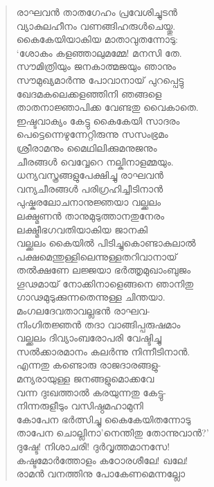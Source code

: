 \begin{verse}
രാഘവന്‍ താതഗേഹം പ്രവേശിച്ചുടന്‍\\
വ്യാകുലഹീനം വണങ്ങിഹരുള്‍ചെയ്തു.\\
കൈകേയിയാകിയ മാതാവുതന്നോടു:\\
‘ശോകം കളഞ്ഞാലുമമ്മേ! മനസി തേ.\\
സൗമിത്രിയും ജനകാത്മജയും ഞാനും\\
സൗമുഖ്യമാര്‍ന്നു പോവാനായ് പുറപ്പെട്ടു\\
ഖേദമകലെക്കളഞ്ഞിനി ഞങ്ങളെ\\
താതനാജ്ഞാപിക്ക വേണ്ടതു വൈകാതെ.\\
ഇഷ്ടവാക്യം കേട്ടു കൈകേയി സാദരം\\
പെട്ടെന്നെഴുന്നേറ്റിരുന്നു സസംഭ്രമം\\
ശ്രീരാമനും മൈഥിലിക്കുമനുജനും\\
ചീരങ്ങള്‍ വെവ്വേറെ നല്കിനാളമ്മയും.\\
ധന്യവസ്ത്രങ്ങളുപേക്ഷിച്ചു രാഘവന്‍\\
വന്യചീരങ്ങള്‍ പരിഗ്രഹിച്ചീടിനാന്‍\\
പുഷ്കരലോചനാനുജ്ഞയാ വല്ക്കലം\\
ലക്ഷ്മണന്‍ താനുമുടുത്താനതുനേരം\\
ലക്ഷ്മീഭഗവതിയാകിയ ജാനകി\\
വല്ക്കലം കൈയില്‍ പിടിച്ചുകൊണ്ടാകുലാല്‍\\
പക്ഷമെന്തുള്ളിലെന്നുള്ളതറിവാനായ്\\
തല്‍ക്ഷണേ ലജ്ജയാ ഭര്‍ത്തൃമുഖാംബുജം\\
ഗൂഢമായ് നോക്കിനാളെങ്ങനെ ഞാനിതു\\
ഗാഢമുടുക്കുന്നതെന്നുള്ള ചിന്തയാ.\\
മംഗലദേവതാവല്ലഭന്‍ രാഘവ-\\
നിംഗിതജ്ഞന്‍ തദാ വാങ്ങിപ്പരുഷമാം\\
വല്ക്കലം ദിവ്യാംബരോപരി വേഷ്ടിച്ചു\\
സല്‍ക്കാരമാനം കലര്‍ന്നു നിന്നീടിനാന്‍.\\
എന്നതു കണ്ടൊരു രാജദാരങ്ങളു-\\
മന്യരായുള്ള ജനങ്ങളുമൊക്കവേ\\
വന്ന ദുഃഖത്താല്‍ കരയുന്നതു കേട്ടു-\\
നിന്നരുളീടും വസിഷ്ഠമഹാമുനി\\
കോപേന ഭര്‍ത്സിച്ചു കൈകേയിതന്നോടു\\
താപേന ചൊല്ലിനാ’നെന്തിതു തോന്നുവാന്‍?’\\
ദുഷ്ടേ! നിശാചരി! ദുര്‍വൃത്തമാനസേ!\\
കഷ്ടമോര്‍ത്തോളം കഠോരശീലേ! ഖലേ!\\
രാമന്‍ വനത്തിനു പോകേണമെന്നല്ലോ\\

\end{verse}

